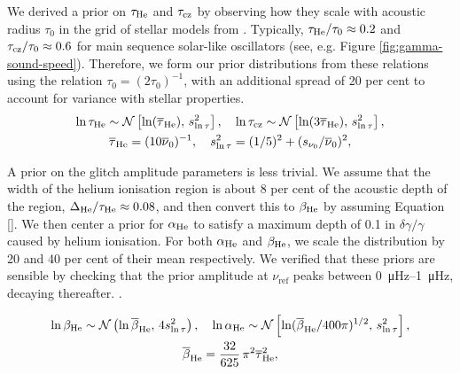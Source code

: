 
We derived a prior on \(\tau_{{\mathrm{He}}}\) and \(\tau_{{\mathrm{cz}}}\) by observing how they scale with acoustic radius \(\tau_0\) in the grid of stellar models from \citep{Lyttle.Davies.ea2021}. Typically, \(\tau_{{\mathrm{He}}}/\tau_0 \approx 0.2\) and \(\tau_{{\mathrm{cz}}}/\tau_0 \approx 0.6\) for main sequence solar-like oscillators (see, e.g. Figure \ref{fig:gamma-sound-speed}). Therefore, we form our prior distributions from these relations using the relation \({\tau}_0 = (2\tau_0)^{-1}\), with an additional spread of 20 per cent to account for variance with stellar properties.
%
\begin{gather*}
    \ln\tau_{{\mathrm{He}}} \sim \mathcal{N}\left[ \ln(\overline{\tau}_{{\mathrm{He}}}), \, s_{\ln\tau}^2 \right], \quad \ln\tau_{{\mathrm{cz}}} \sim \mathcal{N}\left[\ln(3\overline{\tau}_{{\mathrm{He}}}), \, s_{\ln\tau}^2 \right],\\
    \overline{\tau}_{{\mathrm{He}}} = (10 \overline{\nu}_0)^{-1}, \quad s_{\ln\tau}^2 = (1/5)^2 + (s_{\nu_0}/\overline{\nu}_0)^2,
\end{gather*}

A prior on the glitch amplitude parameters is less trivial. We assume that the width of the helium ionisation region is about 8 per cent of the acoustic depth of the region, \(\Delta_{{\mathrm{He}}}/\tau_{{\mathrm{He}}} \approx 0.08\), and then convert this to \(\beta_{{\mathrm{He}}}\) by assuming Equation \ref{}. We then center a prior for \(\alpha_{{\mathrm{He}}}\) to satisfy a maximum depth of 0.1 in \(\delta\gamma/\gamma\) caused by helium ionisation. For both \(\alpha_{{\mathrm{He}}}\) and \(\beta_{{\mathrm{He}}}\), we scale the distribution by 20 and 40 per cent of their mean respectively. We verified that these priors are sensible by checking that the prior amplitude at \(\nu_\mathrm{ref}\) peaks between \SIrange{0}{1}{\micro\hertz}, decaying thereafter. .

\begin{gather*}
    \ln\beta_{{\mathrm{He}}} \sim \mathcal{N}\left( \ln\overline{\beta}_{{\mathrm{He}}}, \, 4 s_{\ln\tau}^2 \right), \quad \ln\alpha_{{\mathrm{He}}} \sim \mathcal{N}\left[ \ln({\overline{\beta}_{{\mathrm{He}}}}/{400\pi})^{1/2}, \, s_{\ln\tau}^2 \right],\\
    \overline{\beta}_{{\mathrm{He}}} = \frac{32}{625} \, \pi^2 \overline{\tau}_{{\mathrm{He}}}^2,
\end{gather*}

